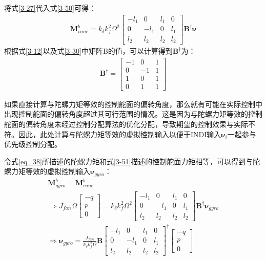 将式\eqref{3-27}代入式\eqref{3-50}可得：
\begin{gather}
    \boldsymbol{M}_{vane}^b=k_{\delta}k_f^2\Omega^2\begin{bmatrix}
        -l_1 & 0 & l_1 & 0 \\
        0 & -l_1 & 0 & l_1 \\
        l_2 & l_2 & l_2 & l_2
        \end{bmatrix}\boldsymbol{B}^{\dagger}\boldsymbol{\nu}
    \label{3-51}
\end{gather}
根据式\eqref{3-12}以及式\eqref{3-30}中矩阵B的值，可以计算得到$\boldsymbol{B}^{\dagger}$为：
\begin{gather}
    \boldsymbol{B}^{\dagger}=
        \begin{bmatrix}
        -1 & 0 & 1 \\
        0 & -1 & 1  \\
        1 & 0 & 1 \\
        0 & 1 & 1
        \end{bmatrix}
    \label{3-52}
\end{gather}

如果直接计算与陀螺力矩等效的控制舵面的偏转角度，那么就有可能在实际控制中出现控制舵面的偏转角度超过其可行范围的情况。这是因为与陀螺力矩等效的控制舵面的偏转角度未经过控制分配算法的优化分配，导致期望的控制效果与实际不符。因此，此处计算与陀螺力矩等效的虚拟控制输入以便于INDI输入$\boldsymbol{\nu}_i$一起参与优先级控制分配。

令式\eqref{eq_38}所描述的陀螺力矩和式\eqref{3-51}描述的控制舵面力矩相等，可以得到与陀螺力矩等效的虚拟控制输入$\boldsymbol{\nu}_{gyro}$：
\begin{equation}
    \begin{gathered}
        \boldsymbol{M}_{gyro}^b=\boldsymbol{M}_{vane}^b\\
        \Rightarrow J_{fan}\Omega\begin{bmatrix}-q \\ p \\ 0\end{bmatrix}
        =
        k_{\delta}k_f^2\Omega^2\begin{bmatrix}
            -l_1 & 0 & l_1 & 0 \\
            0 & -l_1 & 0 & l_1 \\
            l_2 & l_2 & l_2 & l_2
            \end{bmatrix}\boldsymbol{B}^{\dagger}\boldsymbol{\nu}_{gyro}\\
        \Rightarrow \boldsymbol{\nu}_{gyro}=\frac{J_{fan}}{k_{\delta}k_f^2\Omega}\boldsymbol{B}\begin{bmatrix}
            -l_1 & 0 & l_1 & 0 \\
            0 & -l_1 & 0 & l_1 \\
            l_2 & l_2 & l_2 & l_2
            \end{bmatrix}^{\dagger}\begin{bmatrix}-q \\ p \\ 0\end{bmatrix}
        \label{3-53}
    \end{gathered}
\end{equation}

